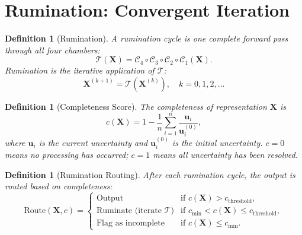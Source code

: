 \documentclass[twocolumn,10pt]{article}
\newtheorem{definition}[theorem]{Definition}
\theoremstyle{remark}
\newcommand{\Tcomp}{\mathcal{T}}
\newcommand{\chamber}[1]{\mathcal{C}_{#1}}
\begin{document}
\section{Rumination: Convergent Iteration}
\label{sec:rumination}

\begin{definition}[Rumination]
\label{def:rumination}
A \emph{rumination cycle} is one complete forward pass through all four chambers:
\begin{equation}
    \Tcomp(\mathbf{X}) = \chamber{4} \circ \chamber{3} \circ \chamber{2} \circ \chamber{1}(\mathbf{X}).
    \label{eq:rumination}
\end{equation}
\emph{Rumination} is the iterative application of $\Tcomp$:
\begin{equation}
    \mathbf{X}^{(k+1)} = \Tcomp(\mathbf{X}^{(k)}), \quad k = 0, 1, 2, \ldots
    \label{eq:iteration}
\end{equation}
\end{definition}

\begin{definition}[Completeness Score]
\label{def:completeness}
The \emph{completeness} of representation $\mathbf{X}$ is
\begin{equation}
    c(\mathbf{X}) = 1 - \frac{1}{n} \sum_{i=1}^n \frac{\mathbf{u}_i}{\mathbf{u}_i^{(0)}},
    \label{eq:completeness}
\end{equation}
where $\mathbf{u}_i$ is the current uncertainty and $\mathbf{u}_i^{(0)}$ is the initial uncertainty.  $c = 0$ means no processing has occurred; $c = 1$ means all uncertainty has been resolved.
\end{definition}

\begin{definition}[Rumination Routing]
\label{def:routing}
After each rumination cycle, the output is routed based on completeness:
\begin{equation}
    \text{Route}(\mathbf{X}, c) = \begin{cases}
        \text{Output} & \text{if } c(\mathbf{X}) > c_{\text{threshold}}, \\
        \text{Ruminate (iterate } \Tcomp \text{)} & \text{if } c_{\text{min}} < c(\mathbf{X}) \leq c_{\text{threshold}}, \\
        \text{Flag as incomplete} & \text{if } c(\mathbf{X}) \leq c_{\text{min}}.
    \end{cases}
    \label{eq:routing}
\end{equation}
\end{definition}
\end{document}
